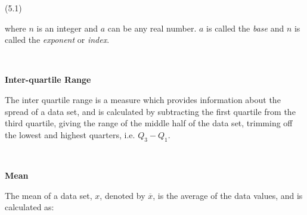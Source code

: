 \begin{description}
\begin{description}
{\begin{minipage}{\columnwidth}
{    (5.1)}
    \end{minipage}\vspace{12pt}\par
    }%
      \label{m38359*id62692}where $n$ is an integer and \begin{math}a\end{math} can be any real number. \begin{math}a\end{math} is called the \textsl{base} and \begin{math}n\end{math} is called the \textsl{exponent} or \textsl{index}. \par 
      \\\end{description}
	    \vspace{.3cm}
	    \item[{\large \bfseries I}]\noindent\raggedright
	    {\bf  Inter-quartile Range }\\\begin{description}\item{\hspace{.3cm}}\hspace{.3cm}
          \label{m39400*id214019}The inter quartile range is a measure which provides information about the spread of a data set, and is calculated by subtracting the first quartile from the third quartile, giving the range of the middle half of the data set, trimming off the lowest and highest quarters, i.e. ${Q}_{3}-{Q}_{1}$. \par 
          \\\end{description}
	    \vspace{.3cm}
	    \item[{\large \bfseries M}]\noindent\raggedright
	    {\bf  Mean }\\\begin{description}\item{\hspace{.3cm}}\hspace{.3cm}
          \label{m39400*id211228}The mean of a data set, $x$, denoted by \begin{math}\overline{x}\end{math}, is the average of the data values, and is calculated as:\par 
          \label{m39400*uid61}\nopagebreak\noindent{}\settowidth{\mymathboxwidth}{\begin{equation}

\end{equation}}
\end{description}
\end{description}
